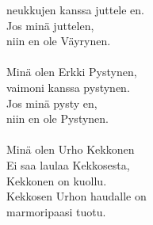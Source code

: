             neukkujen kanssa juttele en. \\
            Jos minä juttelen, \\
            niin en ole Väyrynen. \\
\hspace{10mm} \\
            Minä olen Erkki Pystynen, \\
            vaimoni kanssa pystynen. \\
            Jos minä pysty en, \\
            niin en ole Pystynen. \\
\hspace{10mm} \\
            Minä olen Urho Kekkonen \\
            Ei saa laulaa Kekkosesta, \\
            Kekkonen on kuollu. \\
            Kekkosen Urhon haudalle on \\
            marmoripaasi tuotu. \\
